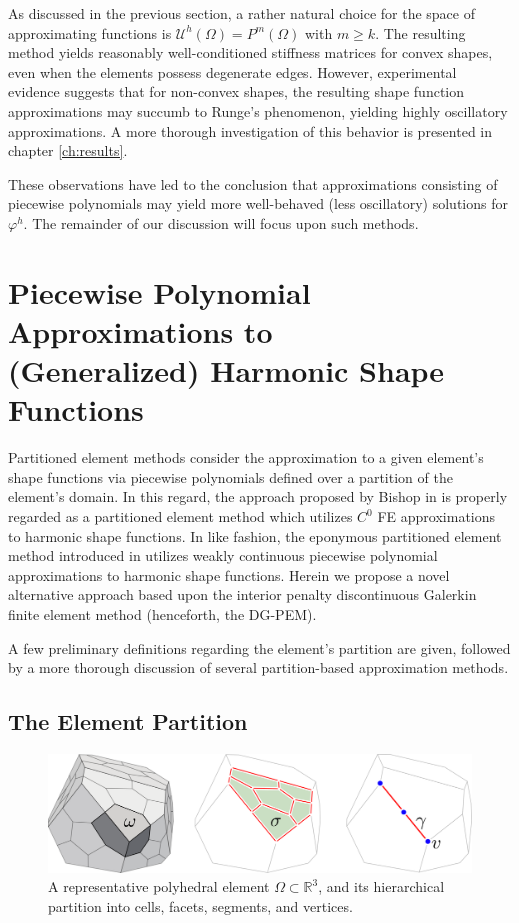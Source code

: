 	As discussed in the previous section, a rather natural choice for the space of approximating functions is $\mathcal{U}^h (\Omega) = P^{m} (\Omega)$ with $m \geq k$. The resulting method yields reasonably well-conditioned stiffness matrices for convex shapes, even when the elements possess degenerate edges. However, experimental evidence suggests that for non-convex shapes, the resulting shape function approximations may succumb to Runge's phenomenon, yielding highly oscillatory approximations. A more thorough investigation of this behavior is presented in chapter \ref{ch:results}.
	
	These observations have led to the conclusion that approximations consisting of piecewise polynomials may yield more well-behaved (less oscillatory) solutions for $\varphi^h$. The remainder of our discussion will focus upon such methods.
	
\section{Piecewise Polynomial Approximations to \\ (Generalized) Harmonic Shape Functions}

Partitioned element methods consider the approximation to a given element's shape functions via piecewise polynomials defined over a partition of the element's domain. In this regard, the approach proposed by Bishop in \cite{Bishop:14} is properly regarded as a partitioned element method which utilizes $C^0$ FE approximations to harmonic shape functions. In like fashion, the eponymous partitioned element method introduced in \cite{Rashid:12} utilizes weakly continuous piecewise polynomial approximations to harmonic shape functions. Herein we propose a novel alternative approach based upon the interior penalty discontinuous Galerkin finite element method (henceforth, the DG-PEM).

A few preliminary definitions regarding the element's partition are given, followed by a more thorough discussion of several partition-based approximation methods.

\subsection*{The Element Partition}

\begin{figure} [!ht]
	\centering
	\includegraphics[width = 6.0in]{figures/polyhedron_partition.pdf}
	\caption{A representative polyhedral element $\Omega \subset \mathbb{R}^3$, and its hierarchical partition into cells, facets, segments, and vertices.}
	\label{fig:partitioned_element}
\end{figure}


